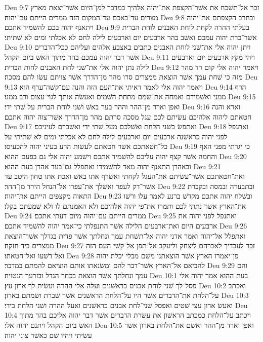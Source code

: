 Deu 9:7  זכר אל־תשׁכח את אשׁר־הקצפת את־יהוה אלהיך במדבר למן־היום אשׁר־יצאת מארץ מצרים עד־באכם עד־המקום הזה ממרים הייתם עם־יהוה׃
Deu 9:8  ובחרב הקצפתם את־יהוה ויתאנף יהוה בכם להשׁמיד אתכם׃
Deu 9:9  בעלתי ההרה לקחת לוחת האבנים לוחת הברית אשׁר־כרת יהוה עמכם ואשׁב בהר ארבעים יום וארבעים לילה לחם לא אכלתי ומים לא שׁתיתי׃
Deu 9:10  ויתן יהוה אלי את־שׁני לוחת האבנים כתבים באצבע אלהים ועליהם ככל־הדברים אשׁר דבר יהוה עמכם בהר מתוך האשׁ ביום הקהל׃
Deu 9:11  ויהי מקץ ארבעים יום וארבעים לילה נתן יהוה אלי את־שׁני לחת האבנים לחות הברית׃
Deu 9:12  ויאמר יהוה אלי קום רד מהר מזה כי שׁחת עמך אשׁר הוצאת ממצרים סרו מהר מן־הדרך אשׁר צויתם עשׂו להם מסכה׃
Deu 9:13  ויאמר יהוה אלי לאמר ראיתי את־העם הזה והנה עם־קשׁה־ערף הוא׃
Deu 9:14  הרף ממני ואשׁמידם ואמחה את־שׁמם מתחת השׁמים ואעשׂה אותך לגוי־עצום ורב ממנו׃
Deu 9:15  ואפן וארד מן־ההר וההר בער באשׁ ושׁני לוחת הברית על שׁתי ידי׃
Deu 9:16  וארא והנה חטאתם ליהוה אלהיכם עשׂיתם לכם עגל מסכה סרתם מהר מן־הדרך אשׁר־צוה יהוה אתכם׃
Deu 9:17  ואתפשׂ בשׁני הלחת ואשׁלכם מעל שׁתי ידי ואשׁברם לעיניכם׃
Deu 9:18  ואתנפל לפני יהוה כראשׁנה ארבעים יום וארבעים לילה לחם לא אכלתי ומים לא שׁתיתי על כל־חטאתכם אשׁר חטאתם לעשׂות הרע בעיני יהוה להכעיסו׃
Deu 9:19  כי יגרתי מפני האף והחמה אשׁר קצף יהוה עליכם להשׁמיד אתכם וישׁמע יהוה אלי גם בפעם ההוא׃
Deu 9:20  ובאהרן התאנף יהוה מאד להשׁמידו ואתפלל גם־בעד אהרן בעת ההוא׃
Deu 9:21  ואת־חטאתכם אשׁר־עשׂיתם את־העגל לקחתי ואשׂרף אתו באשׁ ואכת אתו טחון היטב עד אשׁר־דק לעפר ואשׁלך את־עפרו אל־הנחל הירד מן־ההר׃
Deu 9:22  ובתבערה ובמסה ובקברת התאוה מקצפים הייתם את־יהוה׃
Deu 9:23  ובשׁלח יהוה אתכם מקדשׁ ברנע לאמר עלו ורשׁו את־הארץ אשׁר נתתי לכם ותמרו את־פי יהוה אלהיכם ולא האמנתם לו ולא שׁמעתם בקלו׃
Deu 9:24  ממרים הייתם עם־יהוה מיום דעתי אתכם׃
Deu 9:25  ואתנפל לפני יהוה את ארבעים היום ואת־ארבעים הלילה אשׁר התנפלתי כי־אמר יהוה להשׁמיד אתכם׃
Deu 9:26  ואתפלל אל־יהוה ואמר אדני יהוה אל־תשׁחת עמך ונחלתך אשׁר פדית בגדלך אשׁר־הוצאת ממצרים ביד חזקה׃
Deu 9:27  זכר לעבדיך לאברהם ליצחק וליעקב אל־תפן אל־קשׁי העם הזה ואל־רשׁעו ואל־חטאתו׃
Deu 9:28  פן־יאמרו הארץ אשׁר הוצאתנו משׁם מבלי יכלת יהוה להביאם אל־הארץ אשׁר־דבר להם ומשׂנאתו אותם הוציאם להמתם במדבר׃
Deu 9:29  והם עמך ונחלתך אשׁר הוצאת בכחך הגדל ובזרעך הנטויה׃
Deu 10:1  בעת ההוא אמר יהוה אלי פסל־לך שׁני־לוחת אבנים כראשׁנים ועלה אלי ההרה ועשׂית לך ארון עץ׃
Deu 10:2  ואכתב על־הלחת את־הדברים אשׁר היו על־הלחת הראשׁנים אשׁר שׁברת ושׂמתם בארון׃
Deu 10:3  ואעשׂ ארון עצי שׁטים ואפסל שׁני־לחת אבנים כראשׁנים ואעל ההרה ושׁני הלחת בידי׃
Deu 10:4  ויכתב על־הלחת כמכתב הראשׁון את עשׂרת הדברים אשׁר דבר יהוה אליכם בהר מתוך האשׁ ביום הקהל ויתנם יהוה אלי׃
Deu 10:5  ואפן וארד מן־ההר ואשׂם את־הלחת בארון אשׁר עשׂיתי ויהיו שׁם כאשׁר צוני יהוה׃
